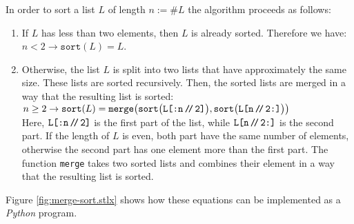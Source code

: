 In order to sort a list $L$ of length $n := \#L$ the algorithm proceeds as follows:
\begin{enumerate}
\item If $L$ has less than two elements, then $L$ is already sorted.  Therefore we have: 
      \\[0.2cm]
      \hspace*{1.3cm}
      $n < 2 \rightarrow \mathtt{sort}(L) = L$.
\item Otherwise, the list $L$ is split into two lists that have approximately the same size.
      These lists are sorted recursively.  Then, the sorted lists are merged in a way that the
      resulting list is sorted: \\[0.2cm]
      \hspace*{1.3cm} 
      $n \geq 2 \rightarrow \mathtt{sort}(L) =
         \mathtt{merge}\bigl(\mathtt{sort}\bigl(\texttt{L[:n\mbox{\,\texttt{/}$\!$\texttt{/}\,}2]}\bigr),
         \mathtt{sort}\bigl(\texttt{L[n\mbox{\,\texttt{/}$\!$\texttt{/}\,}2:]}\bigr)\bigr)
     $
     \\[0.2cm]
     Here,  $\texttt{L[:n\mbox{\,\texttt{/}$\!$\texttt{/}\,}2]}$ is the first part of the list, while
     $\texttt{L[n\mbox{\,\texttt{/}$\!$\texttt{/}\,}2:]}$ is the second part.  If the length of $L$ is even, both part have the same number of
     elements, otherwise the second part has one element more than the first part.  The function \texttt{merge}
     takes two sorted lists and combines their element in a way that the resulting list is sorted.
\end{enumerate}
Figure \ref{fig:merge-sort.stlx} shows how these equations can be implemented as a \textsl{Python}
program.  

